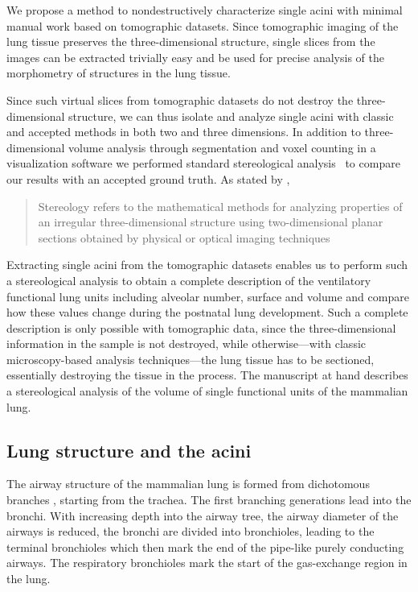 \documentclass[twoside,paper=a4,abstract=true,english,DIV=calc]{scrartcl}
\begin{document}
We propose a method to nondestructively characterize single acini with minimal manual work based on tomographic datasets. Since tomographic imaging of the lung tissue preserves the three-dimensional structure, single slices from the images can be extracted trivially easy and be used for precise analysis of the morphometry of structures in the lung tissue.

Since such virtual slices from tomographic datasets do not destroy the three-dimensional structure, we can thus isolate and analyze single acini with classic and accepted methods in both two and three dimensions. In addition to three-dimensional volume analysis through segmentation and voxel counting in a visualization software we performed standard stereological analysis~\cite{Hsia2010} to compare our results with an accepted ground truth. As stated by \citet{Hsia2010}, \blockquote{Stereology refers to the mathematical methods for analyzing properties of an irregular three-dimensional structure using two-dimensional planar sections obtained by physical or optical imaging techniques}.

Extracting single acini from the tomographic datasets enables us to perform such a stereological analysis to obtain a complete description of the ventilatory functional lung units including alveolar number, surface and volume and compare how these values change during the postnatal lung development. Such a complete description is only possible with tomographic data, since the three-dimensional information in the sample is not destroyed, while otherwise---with classic microscopy-based analysis techniques---the lung tissue has to be sectioned, essentially destroying the tissue in the process. The manuscript at hand describes a stereological analysis of the volume of single functional units of the mammalian lung.

\subsection{Lung structure and the acini}
The airway structure of the mammalian lung is formed from dichotomous branches \cite{Weibel1991}, starting from the trachea. The first branching generations lead into the bronchi. With increasing depth into the airway tree, the airway diameter of the airways is reduced, the bronchi are divided into bronchioles, leading to the terminal bronchioles which then mark the end of the pipe-like purely conducting airways. The respiratory bronchioles mark the start of the gas-exchange region in the lung.
\end{document}
